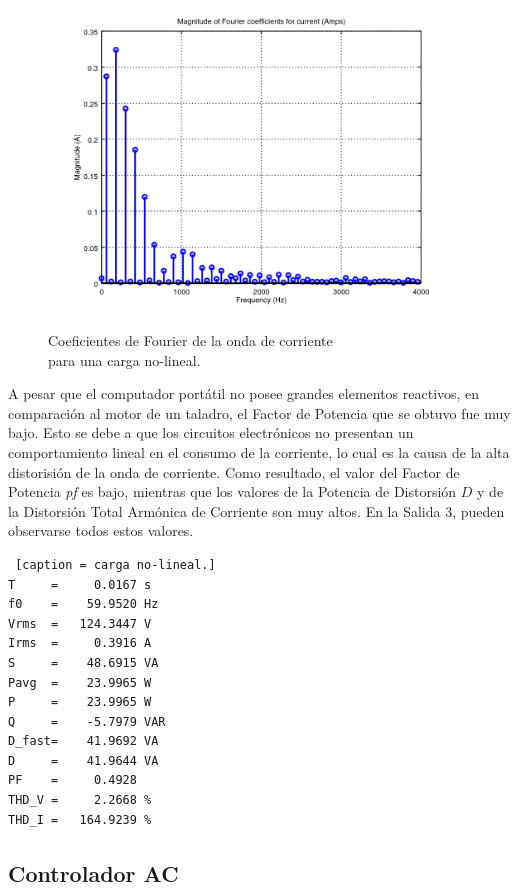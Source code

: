 \documentclass[journal]{IEEEtran}
\begin{document}
\begin{figure}[h]
\centering
\includegraphics[clip,width=0.9\columnwidth]
{zoomed_current_furier_coefficients_computer.png}
\caption{Coeficientes de Fourier de la onda de corriente\\
para una carga no-lineal.}
\label{fourier_corrent_coefficients_nonlinear}
\end{figure}

A pesar que el computador portátil no posee grandes 
elementos reactivos, en comparación al motor de un taladro, 
el Factor de Potencia que se obtuvo fue muy bajo. 
Esto se debe a que los circuitos electrónicos no presentan
un comportamiento lineal en el consumo de la corriente, lo 
cual  
es la causa de la alta distorisión de la onda de corriente. 
Como resultado, el valor del Factor de Potencia \textit{pf}
es bajo, mientras que los valores de la 
Potencia de Distorsión $D$ y de
la Distorsión Total Armónica de Corriente son muy altos. 
En la Salida 3, pueden observarse todos estos valores. 

\begin{lstlisting} [caption = carga no-lineal.]
T     =     0.0167 s 
f0    =    59.9520 Hz 
Vrms  =   124.3447 V
Irms  =     0.3916 A
S     =    48.6915 VA
Pavg  =    23.9965 W 
P     =    23.9965 W 
Q     =    -5.7979 VAR 
D_fast=    41.9692 VA 
D     =    41.9644 VA 
PF    =     0.4928 
THD_V =     2.2668 %
THD_I =   164.9239 %
\end{lstlisting}

\subsection{Controlador AC}
\end{document}
